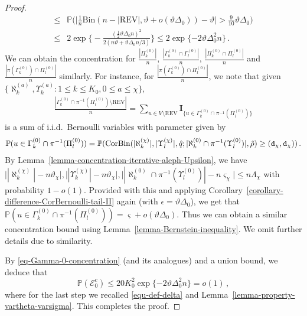 \documentclass[11pt]{article}
\numberwithin{equation}{section}
\begin{document}
\begin{proof}
\begin{align}
    \leq & \mathbb{P} \Big(  \Big| \frac{1}{n} \mathrm{Bin}( n-|\mathrm{REV}|, \vartheta+o( \vartheta \Delta_0 ) ) - \vartheta \Big| > \frac{9}{10} \vartheta \Delta_{0}  \Big) \nonumber \\
    \leq & 2 \exp \Big\{ - \frac{ ( \frac{1}{2} \vartheta \Delta_0 n )^2 }{ 2 (n \vartheta +  \vartheta \Delta_0 n /3 ) }  \Big\} \leq 2 \exp \{ -2 \vartheta \Delta_0^2 n \} \label{eq-Gamma-0-concentration}\,.
\end{align}
We can obtain the concentration for $\frac{|\Pi^{(0)}_k|}{n}$, $\frac{|\Gamma^{(0)}_k \cap \Gamma^{(0)}_l|}{n}$, $\frac{|\Pi^{(0)}_k \cap \Pi^{(0)}_l|}{n}$ and $\frac{| \pi(\Gamma^{(0)}_k) \cap \Pi^{(0)}_l|}{n}$ similarly. For instance, for $\frac{|\pi(\Gamma^{(0)}_k) \cap \Pi^{(0)}_l|}{n}$, we note that given $\{ \aleph^{(a)}_k, \Upsilon^{(a)}_k: 1 \leq k \leq K_0, 0 \leq a \leq \chi\}$,
\begin{align*}
    \frac{|\Gamma^{(0)}_k \cap \pi^{-1}(\Pi^{(0)}_l) \setminus \mathrm{REV}|}{n} = \sum_{ u \in V \setminus \mathrm{REV} } \mathbf{I}_{ \{ u \in \Gamma^{(0)}_k \cap \pi^{-1}(\Pi^{(0)}_l) \} } 
\end{align*}
is a sum of i.i.d.\ Bernoulli  variables with parameter given by
\begin{align*}
    \mathbb{P}(u \in \Gamma^{(0)}_k \cap \pi^{-1}(\Pi^{(0)}_l) ) = \mathbb{P}(  \mathrm{CorBin}( |\aleph^{(\chi)}_k|, |\Upsilon^{(\chi)}_l|, \Hat{q}; |\aleph^{(0)}_k \cap \pi^{-1}(\Upsilon^{(0)}_l)| , \Hat{\rho} ) \geq (\mathtt{d}_{\chi},\mathtt{d}_{\chi})  )\,.
\end{align*}
By Lemma~\ref{lemma-concentration-iterative-aleph-Upsilon}, we have $\big| |\aleph^{(\chi)}_k| - n \vartheta_{\chi} \big|, \big| |\Upsilon^{(\chi)}_k| - n \vartheta_{\chi} \big|, \big| |\aleph^{(0)}_k \cap \pi^{-1}(\Upsilon^{(0)}_l)| - n \varsigma_{\chi} \big| \leq n \Lambda_{\chi}$ with probability $1-o(1)$. Provided with this and applying Corollary~\ref{corollary-difference-CorBernoulli-tail-II} again (with $\epsilon = \vartheta \Delta_0$), we get that $\mathbb{P}( u \in \Gamma^{(0)}_k \cap \pi^{-1}(\Pi^{(0)}_l) )= \varsigma + o(\vartheta \Delta_0)$. Thus we can obtain a similar concentration bound using Lemma~\ref{lemma-Bernstein-inequality}. We omit further details due to similarity. 

By \eqref{eq-Gamma-0-concentration} (and its analogues) and a union bound, we deduce that
\begin{equation}\label{eq-mathcal-E-0-bound}
    \mathbb{P} (\mathcal{E}_0^{c}) \leq 20 K_0^2 \exp \{ -2 \vartheta \Delta_0^2 n \} = o(1) \,,
\end{equation}
where for the last step we recalled \eqref{equ-def-delta} and Lemma~\ref{lemma-property-vartheta-varsigma}. This completes the proof.
\end{proof}
\end{document}
